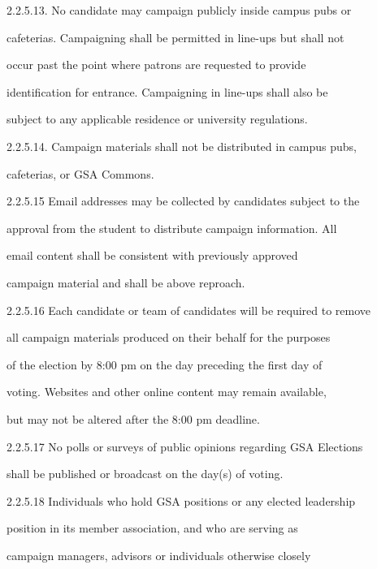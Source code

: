 2.2.5.13. No  candidate  may  campaign  publicly  inside  campus  pubs  or  

             cafeterias. Campaigning shall be permitted in line-ups but shall not  

             occur  past  the  point  where  patrons  are  requested  to  provide  

             identification for entrance. Campaigning in  line-ups shall  also be  

             subject to any applicable residence or university regulations.   

2.2.5.14.  Campaign  materials  shall  not  be  distributed  in  campus  pubs,  

             cafeterias, or GSA Commons.   

  

2.2.5.15      Email  addresses  may  be  collected  by  candidates  subject  to  the  

              approval from the student to distribute campaign information. All  

              email   content   shall   be   consistent   with   previously   approved  

              campaign material and shall be above reproach.   

  

2.2.5.16      Each candidate or team of candidates will be required to remove  

              all campaign materials produced on their behalf for the purposes  

              of the election by 8:00 pm on the day preceding the first day of  

              voting. Websites and other online content may remain available,  

              but may not be altered after the 8:00 pm deadline.   

  

2.2.5.17      No polls or surveys of public opinions regarding GSA Elections  

              shall be published or broadcast on the day(s) of voting.   

  

2.2.5.18      Individuals  who  hold  GSA  positions  or  any  elected  leadership  

              position  in  its  member  association,  and  who  are  serving  as  

              campaign  managers,  advisors  or  individuals  otherwise  closely  

